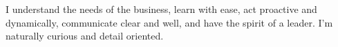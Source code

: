 


\small
I understand the needs of the business, learn with ease, act proactive and dynamically, 
communicate clear and well, and have the spirit of a leader. I'm naturally curious
and detail oriented.
